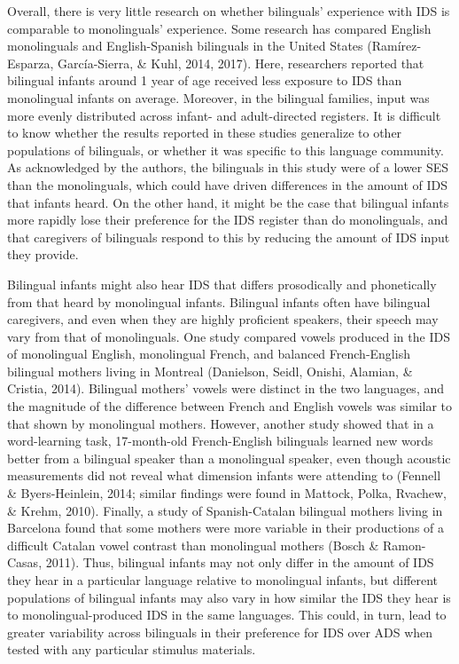 \documentclass[english,,man,floatsintext]{apa6}
\begin{document}
Overall, there is very little research on whether bilinguals' experience with IDS is comparable to monolinguals' experience. Some research has compared English monolinguals and English-Spanish bilinguals in the United States (Ramírez-Esparza, García-Sierra, \& Kuhl, 2014, 2017). Here, researchers reported that bilingual infants around 1 year of age received less exposure to IDS than monolingual infants on average. Moreover, in the bilingual families, input was more evenly distributed across infant- and adult-directed registers. It is difficult to know whether the results reported in these studies generalize to other populations of bilinguals, or whether it was specific to this language community. As acknowledged by the authors, the bilinguals in this study were of a lower SES than the monolinguals, which could have driven differences in the amount of IDS that infants heard. On the other hand, it might be the case that bilingual infants more rapidly lose their preference for the IDS register than do monolinguals, and that caregivers of bilinguals respond to this by reducing the amount of IDS input they provide.

Bilingual infants might also hear IDS that differs prosodically and phonetically from that heard by monolingual infants. Bilingual infants often have bilingual caregivers, and even when they are highly proficient speakers, their speech may vary from that of monolinguals. One study compared vowels produced in the IDS of monolingual English, monolingual French, and balanced French-English bilingual mothers living in Montreal (Danielson, Seidl, Onishi, Alamian, \& Cristia, 2014). Bilingual mothers' vowels were distinct in the two languages, and the magnitude of the difference between French and English vowels was similar to that shown by monolingual mothers. However, another study showed that in a word-learning task, 17-month-old French-English bilinguals learned new words better from a bilingual speaker than a monolingual speaker, even though acoustic measurements did not reveal what dimension infants were attending to (Fennell \& Byers-Heinlein, 2014; similar findings were found in Mattock, Polka, Rvachew, \& Krehm, 2010). Finally, a study of Spanish-Catalan bilingual mothers living in Barcelona found that some mothers were more variable in their productions of a difficult Catalan vowel contrast than monolingual mothers (Bosch \& Ramon-Casas, 2011). Thus, bilingual infants may not only differ in the amount of IDS they hear in a particular language relative to monolingual infants, but different populations of bilingual infants may also vary in how similar the IDS they hear is to monolingual-produced IDS in the same languages. This could, in turn, lead to greater variability across bilinguals in their preference for IDS over ADS when tested with any particular stimulus materials.
\end{document}
